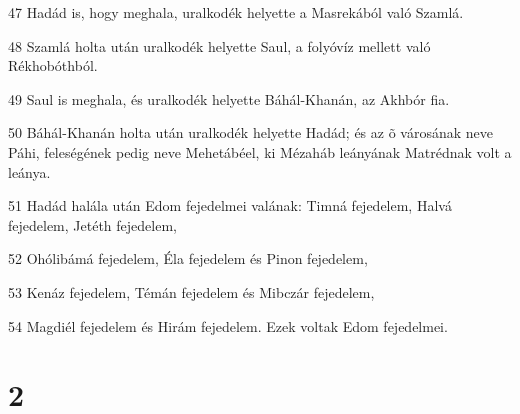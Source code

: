 \par 47 Hadád is, hogy meghala, uralkodék helyette a Masrekából való Szamlá.
\par 48 Szamlá holta után uralkodék helyette Saul, a folyóvíz mellett való Rékhobóthból.
\par 49 Saul is meghala, és uralkodék helyette Báhál-Khanán, az Akhbór fia.
\par 50 Báhál-Khanán holta után uralkodék helyette Hadád; és az õ városának neve Páhi, feleségének pedig neve Mehetábéel, ki Mézaháb leányának Matrédnak volt a leánya.
\par 51 Hadád halála után Edom fejedelmei valának: Timná fejedelem, Halvá fejedelem, Jetéth fejedelem,
\par 52 Ohólibámá fejedelem, Éla fejedelem és Pinon fejedelem,
\par 53 Kenáz fejedelem, Témán fejedelem és Mibczár fejedelem,
\par 54 Magdiél fejedelem és Hirám fejedelem. Ezek voltak Edom fejedelmei.

\chapter{2}

